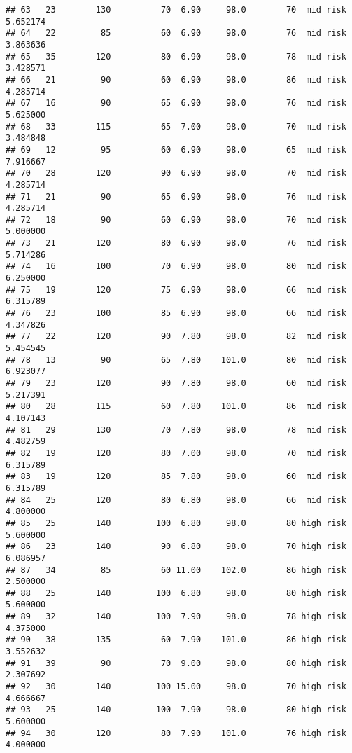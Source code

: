 \documentclass[
  ignorenonframetext,
]{beamer}
\begin{document}
\begin{frame}[fragile]
\begin{verbatim}
## 63   23        130          70  6.90     98.0        70  mid risk      5.652174
## 64   22         85          60  6.90     98.0        76  mid risk      3.863636
## 65   35        120          80  6.90     98.0        78  mid risk      3.428571
## 66   21         90          60  6.90     98.0        86  mid risk      4.285714
## 67   16         90          65  6.90     98.0        76  mid risk      5.625000
## 68   33        115          65  7.00     98.0        70  mid risk      3.484848
## 69   12         95          60  6.90     98.0        65  mid risk      7.916667
## 70   28        120          90  6.90     98.0        70  mid risk      4.285714
## 71   21         90          65  6.90     98.0        76  mid risk      4.285714
## 72   18         90          60  6.90     98.0        70  mid risk      5.000000
## 73   21        120          80  6.90     98.0        76  mid risk      5.714286
## 74   16        100          70  6.90     98.0        80  mid risk      6.250000
## 75   19        120          75  6.90     98.0        66  mid risk      6.315789
## 76   23        100          85  6.90     98.0        66  mid risk      4.347826
## 77   22        120          90  7.80     98.0        82  mid risk      5.454545
## 78   13         90          65  7.80    101.0        80  mid risk      6.923077
## 79   23        120          90  7.80     98.0        60  mid risk      5.217391
## 80   28        115          60  7.80    101.0        86  mid risk      4.107143
## 81   29        130          70  7.80     98.0        78  mid risk      4.482759
## 82   19        120          80  7.00     98.0        70  mid risk      6.315789
## 83   19        120          85  7.80     98.0        60  mid risk      6.315789
## 84   25        120          80  6.80     98.0        66  mid risk      4.800000
## 85   25        140         100  6.80     98.0        80 high risk      5.600000
## 86   23        140          90  6.80     98.0        70 high risk      6.086957
## 87   34         85          60 11.00    102.0        86 high risk      2.500000
## 88   25        140         100  6.80     98.0        80 high risk      5.600000
## 89   32        140         100  7.90     98.0        78 high risk      4.375000
## 90   38        135          60  7.90    101.0        86 high risk      3.552632
## 91   39         90          70  9.00     98.0        80 high risk      2.307692
## 92   30        140         100 15.00     98.0        70 high risk      4.666667
## 93   25        140         100  7.90     98.0        80 high risk      5.600000
## 94   30        120          80  7.90    101.0        76 high risk      4.000000

\end{verbatim}
\end{frame}
\end{document}
